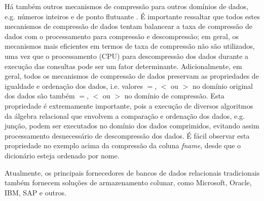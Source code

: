 Há também outros mecanismos de compressão para outros domínios de dados, e.g. números inteiros e de ponto 
flutuante \cite{Abadi2006, Zukowski2006}. É importante ressaltar que todos estes mecanismos de 
compressão de dados tentam balancear a taxa de compressão de dados com o processamento para compressão
e descompressão; em geral, os mecanismos mais eficientes em termos de taxa de compressão não são utilizados,
uma vez que o processamento (CPU) para descompressão dos dados durante a execução das consultas
pode ser um fator determinante. Adicionalmente, em geral, todos os mecanismos de compressão de dados
preservam as propriedades de igualdade e ordenação dos dados, i.e. valores $=$, $<$ ou $>$ no domínio original
dos dados são também $=$, $<$ ou $>$ no domínio de compressão. Esta propriedade é extremamente importante, 
pois a execução de diversos algoritmos da álgebra relacional que envolvem a comparação e ordenação dos
dados, e.g. junção, podem ser executados no domínio dos dados comprimidos, evitando assim processamento 
desnecessário de descompressão dos dados. É fácil observar esta propriedade no exemplo acima da compressão
da coluna \emph{fname}, desde que o dicionário esteja ordenado por nome.

Atualmente, os principais fornecedores de bancos de dados relacionais tradicionais também fornecem 
soluções de armazenamento colunar, como Microsoft, Oracle, IBM, SAP e outros.  

